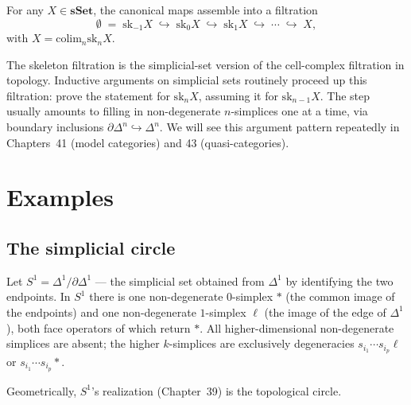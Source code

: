 \begin{lemma}
\label{lem:skeleton-filtration}
For any $X \in \mathbf{sSet}$, the canonical maps assemble into a filtration
\begin{equation*}
  \emptyset \;=\; \mathrm{sk}_{-1} X \;\hookrightarrow\; \mathrm{sk}_0 X \;\hookrightarrow\; \mathrm{sk}_1 X \;\hookrightarrow\; \cdots \;\hookrightarrow\; X,
\end{equation*}
with $X = \mathrm{colim}_n \mathrm{sk}_n X$.
\end{lemma}

\begin{readernote}
The skeleton filtration is the simplicial-set version of the cell-complex
filtration in topology. Inductive arguments on simplicial sets routinely
proceed up this filtration: prove the statement for $\mathrm{sk}_n X$,
assuming it for $\mathrm{sk}_{n-1} X$. The step usually amounts to
filling in non-degenerate $n$-simplices one at a time, via boundary
inclusions $\partial\Delta^n \hookrightarrow \Delta^n$. We will see this
argument pattern repeatedly in Chapters~41 (model categories) and 43
(quasi-categories).
\end{readernote}


\section{Examples}
\label{sec:sset-examples}

\subsection{The simplicial circle}

\begin{example_thm}
\label{ex:simplicial-circle}
Let $S^1 = \Delta^1 / \partial\Delta^1$ — the simplicial set obtained from
$\Delta^1$ by identifying the two endpoints. In $S^1$ there is one
non-degenerate $0$-simplex $*$ (the common image of the endpoints) and one
non-degenerate $1$-simplex $\ell$ (the image of the edge of $\Delta^1$),
both face operators of which return $*$. All higher-dimensional
non-degenerate simplices are absent; the higher $k$-simplices are
exclusively degeneracies $s_{i_1} \cdots s_{i_p} \ell$ or $s_{i_1} \cdots
s_{i_p} *$.

Geometrically, $S^1$'s realization (Chapter~39) is the topological circle.
\end{example_thm}

